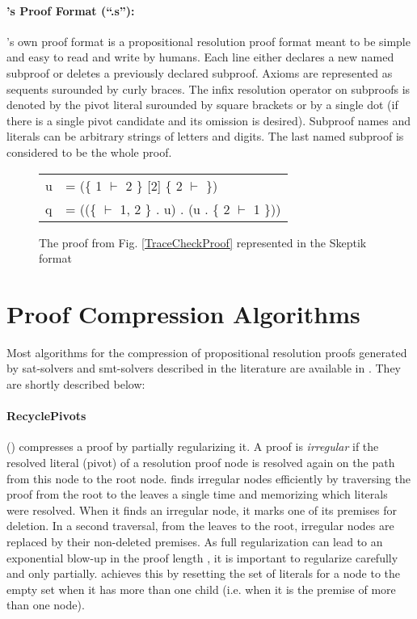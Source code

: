 \documentclass{llncs}
\begin{document}
\paragraph{{\skeptik}'s Proof Format (``.s''): }

{\skeptik}'s own proof format is a propositional resolution proof format meant to be simple and easy to read and write by humans. Each line either declares a new named subproof or deletes a previously declared subproof. Axioms are represented as sequents surounded by curly braces. The infix resolution operator on
subproofs is denoted by the pivot literal surounded by square brackets or by a single dot (if there is a single pivot candidate and its omission is desired). Subproof names and literals can be arbitrary strings of letters and digits. The last named subproof is considered to be the whole proof.

\vspace{-10pt}

\begin{figure}
  \centering
  \begin{tabular}{ll}
    u &= (\{ 1 $\vdash$ 2 \} [2] \{ 2 $\vdash$ \}) \\
    q &= ((\{ $\vdash$ 1, 2 \} . u) . (u . \{ 2 $\vdash$ 1 \}))
  \end{tabular}
  \caption{The proof from Fig. \ref{TraceCheckProof} represented in the Skeptik format}
  \label{SkeptikProof}
\end{figure}

\vspace{-10pt}

\section{Proof Compression Algorithms}

Most algorithms for the compression of propositional resolution proofs generated by sat-solvers and smt-solvers described in the literature are available in {\skeptik}. They are shortly described below:

\paragraph{RecyclePivots} () \cite{RP08,RP11} compresses a proof by partially regularizing it. A proof is \emph{irregular} \cite{Tseitin} if the resolved literal (pivot) of a resolution proof node is resolved again on the path from this node to the root node.  finds irregular nodes efficiently by traversing the proof from the root to the leaves a single time and memorizing which literals were resolved. When it finds an irregular node, it marks one of its premises for deletion. In a second traversal, from the leaves to the root, irregular nodes are replaced by their non-deleted premises. As full regularization can lead to an exponential blow-up in the proof length \cite{Goerdt}, it is important to regularize carefully and only partially.  achieves this by resetting the set of literals for a node to the empty set when it has more than one child (i.e. when it is the premise of more than one node).
\end{document}
